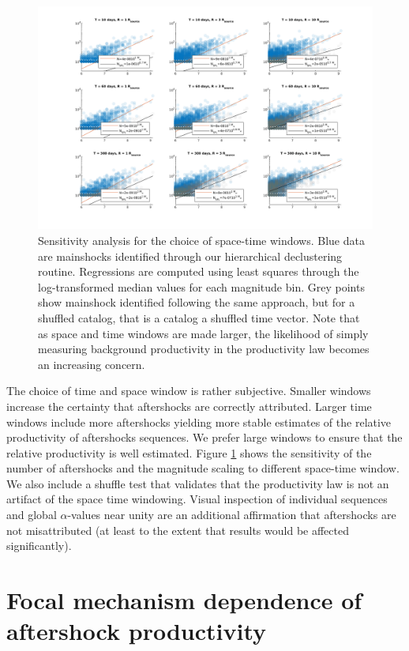 \documentclass[12pt, notitlepage]{report}
\begin{document}
\begin{figure}
    \centering
    \includegraphics{figures/space_time_sensitivity.png}
    \caption{Sensitivity analysis for the choice of space-time windows. Blue data are mainshocks identified through our hierarchical declustering routine. Regressions are computed using least squares through the log-transformed median values for each magnitude bin. Grey points show mainshock identified following the same approach, but for a shuffled catalog, that is a catalog a shuffled time vector. Note that as space and time windows are made larger, the likelihood of simply measuring background productivity in the productivity law becomes an increasing concern.}
    \label{fig:sensitivity}
\end{figure} 

The choice of time and space window is rather subjective. Smaller windows increase the certainty that aftershocks are correctly attributed. Larger time windows include more aftershocks yielding more stable estimates of the relative productivity of aftershocks sequences. We prefer large windows to ensure that the relative productivity is well estimated. Figure \ref{fig:sensitivity} shows the sensitivity of the number of aftershocks and the magnitude scaling to different space-time window. We also include a shuffle test that validates that the productivity law is not an artifact of the space time windowing. Visual inspection of individual sequences and global $\alpha$-values near unity are an additional affirmation that aftershocks are not misattributed (at least to the extent that results would be affected significantly).

\section{Focal mechanism dependence of aftershock productivity}
\end{document}
